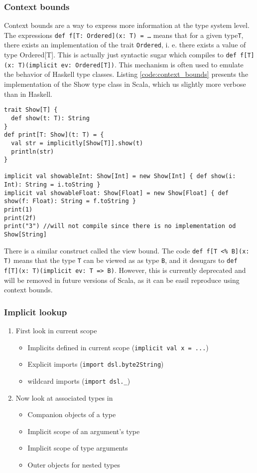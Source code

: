 \subsubsection{Context bounds}
Context bounds are a way to express more information at the type system level. The expressions \texttt{def f[T: Ordered](x: T) = \ldots} means that for a given type\texttt{T}, there exists an implementation of the trait \texttt{Ordered}, i. e. there exists a value of type Ordered[T]. This is actually just syntactic sugar which compiles to \texttt{def f[T](x: T)(implicit ev: Ordered[T])}. This mechanism is often used to emulate the behavior of Haskell type classes. Listing \ref{code:context_bounds} presents the implementation of the Show type class in Scala, which us slightly more verbose than in Haskell.

\begin{lstlisting}[caption=Context bounds, label=code:context_bounds, float]
trait Show[T] {
  def show(t: T): String
}
def print[T: Show](t: T) = {
  val str = implicitly[Show[T]].show(t)
  println(str)
}

implicit val showableInt: Show[Int] = new Show[Int] { def show(i: Int): String = i.toString }
implicit val showableFloat: Show[Float] = new Show[Float] { def show(f: Float): String = f.toString }
print(1)
print(2f)
print("3") //will not compile since there is no implementation od Show[String]
\end{lstlisting}

There is a similar construct called the view bound. The code \texttt{def f[T <\% B](x: T)} means that the type \texttt{T} can be viewed as as type \texttt{B}, and it desugars to \texttt{def f[T](x: T)(implicit ev: T => B)}. However, this is currently deprecated and will be removed in future versions of Scala, as it can be easil reproduce using context bounds.

\subsubsection{Implicit lookup}
\begin{enumerate}
	\item First look in current scope
	\begin{itemize}
		\item Implicits defined in current scope (\texttt{implicit val x = ...})
    \item Explicit imports (\texttt{import dsl.byte2String})
    \item wildcard imports (\texttt{import dsl.\_})
	\end{itemize}
	\item Now look at associated types in
	\begin{itemize}
		\item Companion objects of a type
		\item Implicit scope of an argument’s type
		\item Implicit scope of type arguments
		\item Outer objects for nested types
	\end{itemize}
\end{enumerate}

